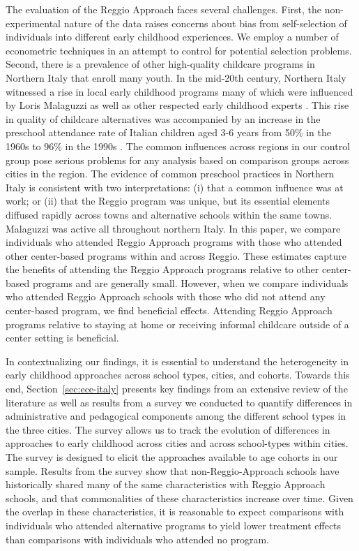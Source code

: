 The evaluation of the Reggio Approach faces several challenges. First, the non-experimental nature of the data raises concerns about bias from self-selection of individuals into different early childhood experiences. We employ a number of econometric techniques in an attempt to control for potential selection problems. Second, there is a prevalence of other high-quality childcare programs in Northern Italy that enroll many youth. In the mid-20th century, Northern Italy witnessed a rise in local early childhood programs many of which were influenced by Loris Malaguzzi as well as other respected early childhood experts \citep{OECD_2001_Italy-Country-Note}. This rise in quality of childcare alternatives was accompanied by an increase in the preschool attendance rate of Italian children aged 3-6 years from 50\% in the 1960s to 96\% in the 1990s \citep{Hohnerlein_2015_Development-and-Diffusion}. The common influences across regions in our control group pose serious problems for any analysis based on comparison groups across cities in the region.  The evidence of common preschool practices in Northern Italy is consistent with two interpretations: (i) that a common influence was at work; or (ii) that the Reggio program was unique, but its essential elements diffused rapidly across towns and alternative schools within the same towns. Malaguzzi was active all throughout northern Italy. In this paper, we compare individuals who attended Reggio Approach programs with those who attended other center-based programs within and across Reggio. These estimates capture the benefits of attending the Reggio Approach programs relative to other center-based programs and are generally small. However, when we compare individuals who attended Reggio Approach schools with those who did not attend any center-based program, we find beneficial effects. Attending Reggio Approach programs relative to staying at home or receiving informal childcare outside of a center setting is beneficial.

In contextualizing our findings, it is essential to understand the heterogeneity in early childhood approaches across school types, cities, and cohorts. Towards this end, Section~\ref{sec:ece-italy} presents key findings from an extensive review of the literature as well as results from a survey we conducted to quantify differences in administrative and pedagogical components among the different school types in the three cities. The survey allows us to track the evolution of differences in approaches to early childhood across cities and across school-types within cities. The survey is designed to elicit the approaches available to age cohorts in our sample. Results from the survey show that non-Reggio-Approach schools have historically shared many of the same characteristics with Reggio Approach schools, and that commonalities of these characteristics increase over time. Given the overlap in these characteristics, it is reasonable to expect comparisons with individuals who attended alternative programs to yield lower treatment effects than comparisons with individuals who attended no program.

